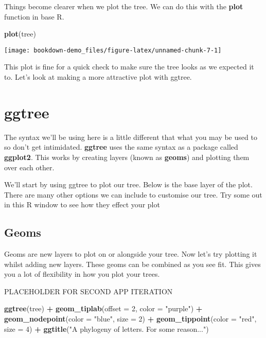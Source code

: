 \documentclass[]{book}
\newenvironment{Shaded}{\begin{snugshade}}{\end{snugshade}}
\newcommand{\KeywordTok}[1]{\textcolor[rgb]{0.13,0.29,0.53}{\textbf{#1}}}
\newcommand{\DataTypeTok}[1]{\textcolor[rgb]{0.13,0.29,0.53}{#1}}
\newcommand{\DecValTok}[1]{\textcolor[rgb]{0.00,0.00,0.81}{#1}}
\newcommand{\StringTok}[1]{\textcolor[rgb]{0.31,0.60,0.02}{#1}}
\newcommand{\OperatorTok}[1]{\textcolor[rgb]{0.81,0.36,0.00}{\textbf{#1}}}
\newcommand{\NormalTok}[1]{#1}
\begin{document}
Things become clearer when we plot the tree. We can do this with the
\textbf{plot} function in base R.

\begin{Shaded}
\begin{Highlighting}[]
\KeywordTok{plot}\NormalTok{(tree)}
\end{Highlighting}
\end{Shaded}

\begin{center}\texttt{[image: bookdown-demo\_files/figure-latex/unnamed-chunk-7-1]} \end{center}

This plot is fine for a quick check to make sure the tree looks as we
expected it to. Let's look at making a more attractive plot with ggtree.

\section{ggtree}\label{ggtree}

The syntax we'll be using here is a little different that what you may
be used to so don't get intimidated. \textbf{ggtree} uses the same
syntax as a package called \textbf{ggplot2}. This works by creating
layers (known as \textbf{geoms}) and plotting them over each other.

We'll start by using ggtree to plot our tree. Below is the base layer of
the plot. There are many other options we can include to customise our
tree. Try some out in this R window to see how they effect your plot

\subsection{Geoms}\label{geoms}

Geoms are new layers to plot on or alongside your tree. Now let's try
plotting it whilst adding new layers. These geoms can be combined as you
see fit. This gives you a lot of flexibility in how you plot your trees.

PLACEHOLDER FOR SECOND APP ITERATION

\begin{Shaded}
\begin{Highlighting}[]
\KeywordTok{ggtree}\NormalTok{(tree) }\OperatorTok{+}\StringTok{ }
\StringTok{  }\KeywordTok{geom_tiplab}\NormalTok{(}\DataTypeTok{offset =} \DecValTok{2}\NormalTok{, }\DataTypeTok{color =} \StringTok{"purple"}\NormalTok{) }\OperatorTok{+}
\StringTok{  }\KeywordTok{geom_nodepoint}\NormalTok{(}\DataTypeTok{color =} \StringTok{"blue"}\NormalTok{, }\DataTypeTok{size =} \DecValTok{2}\NormalTok{) }\OperatorTok{+}
\StringTok{  }\KeywordTok{geom_tippoint}\NormalTok{(}\DataTypeTok{color =} \StringTok{"red"}\NormalTok{, }\DataTypeTok{size =} \DecValTok{4}\NormalTok{) }\OperatorTok{+}
\StringTok{  }\KeywordTok{ggtitle}\NormalTok{(}\StringTok{"A phylogeny of letters. For some reason..."}\NormalTok{)}
\end{Highlighting}
\end{Shaded}
\end{document}
